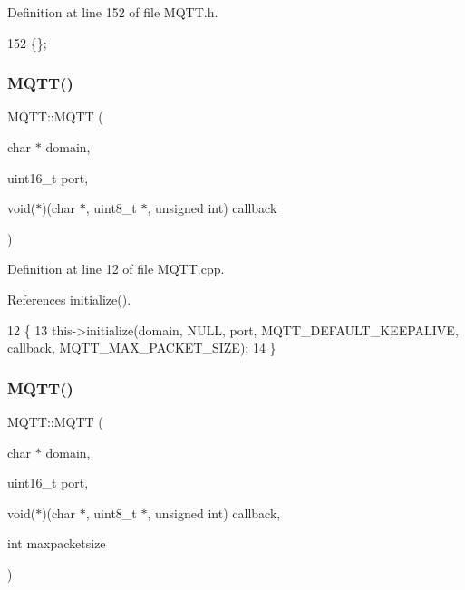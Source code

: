 Definition at line 152 of file M\+Q\+T\+T.\+h.


\begin{DoxyCode}
152 \{\};
\end{DoxyCode}
\mbox{\label{class_m_q_t_t_a2ef4121d54530e1ffc918f2b0e3cbdc4}} 
\subsubsection{M\+Q\+T\+T()\hspace{0.1cm}{\footnotesize\ttfamily [2/9]}}
{\footnotesize\ttfamily M\+Q\+T\+T\+::\+M\+Q\+TT (\begin{DoxyParamCaption}\item[{char $\ast$}]{domain,  }\item[{uint16\+\_\+t}]{port,  }\item[{void($\ast$)(char $\ast$, uint8\+\_\+t $\ast$, unsigned int)}]{callback }\end{DoxyParamCaption})}



Definition at line 12 of file M\+Q\+T\+T.\+cpp.



References initialize().


\begin{DoxyCode}
12                                                                                      \{
13     this->initialize(domain, NULL, port, MQTT_DEFAULT_KEEPALIVE, callback, 
      MQTT_MAX_PACKET_SIZE);
14 \}
\end{DoxyCode}
\mbox{\label{class_m_q_t_t_a95dc3446cd91fd3448c3fe3938a40f72}} 
\subsubsection{M\+Q\+T\+T()\hspace{0.1cm}{\footnotesize\ttfamily [3/9]}}
{\footnotesize\ttfamily M\+Q\+T\+T\+::\+M\+Q\+TT (\begin{DoxyParamCaption}\item[{char $\ast$}]{domain,  }\item[{uint16\+\_\+t}]{port,  }\item[{void($\ast$)(char $\ast$, uint8\+\_\+t $\ast$, unsigned int)}]{callback,  }\item[{int}]{maxpacketsize }\end{DoxyParamCaption})}



